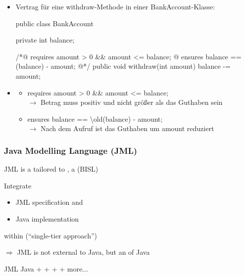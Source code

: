 \begin{infoBox}[title=Beispiel mit JML (Java Modeling Language)]
    \begin{itemize}
        \item Vertrag für eine withdraw-Methode in einer BankAccount-Klasse:
        \begin{codeBlock}{}
            public class BankAccount {
                private int balance;
                
                /*@ requires amount > 0 && amount <= balance;
                  @ ensures balance == \old(balance) - amount;
                  @*/
                public void withdraw(int amount) {
                    balance -= amount;
                }
            }
        \end{codeBlock}
        \item {}
        \begin{itemize}
            \item requires amount > 0 \&\& amount <= balance;\\
            $\rightarrow$  Betrag muss positiv und nicht größer als das Guthaben sein
            \item ensures balance == \textbackslash old(balance) - amount;\\
            $\rightarrow$  Nach dem Aufruf ist das Guthaben um amount reduziert
        \end{itemize}
    \end{itemize}
\end{infoBox}
\subsubsection*{Java Modelling Language (JML)}
JML is a   tailored to , a  (BISL)
\begin{defBox}[title=General JML Philosophy]
    Integrate
    \begin{itemize}
        \item JML specification and
        \item Java implementation
    \end{itemize}
    within  (\enquote{single-tier approach})
\end{defBox}
$\Rightarrow$ JML is not external to Java, but an  of Java
\begin{defBox}
    JML  Java +  +  +  + more...
\end{defBox}
